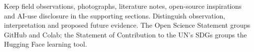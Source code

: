 \noindent Keep field observations, photographs, literature notes, open-source inspirations and AI-use disclosure in the supporting sections. Distinguish observation, interpretation and proposed future evidence. The Open Science Statement groups GitHub and Colab; the Statement of Contribution to the UN's SDGs groups the Hugging Face learning tool.
